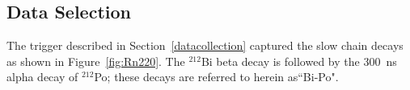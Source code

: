 


\subsection{Data Selection}
The trigger described in Section~\ref{datacollection} captured the slow chain decays as shown in Figure~\ref{fig:Rn220}. The $^{212}$Bi beta decay is followed by the 300~ns alpha decay of $^{212}$Po; these decays are referred to herein as``Bi-Po".



